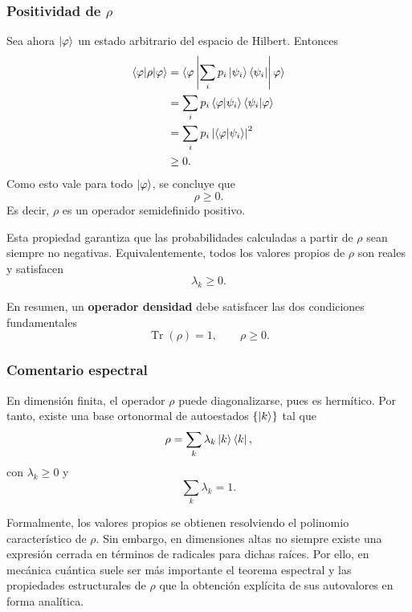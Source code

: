 \documentclass[12pt,a4paper]{article}
\theoremstyle{definition}
\theoremstyle{plain}
\theoremstyle{remark}
\begin{document}
\subsubsection*{Positividad de $\rho$}

Sea ahora $\ket{\varphi}$ un estado arbitrario del espacio de Hilbert. Entonces
\begin{align*}
    \braket{\varphi|\rho|\varphi}
    &= \braket{\varphi\left|\sum_i p_i \ket{\psi_i}\bra{\psi_i}\right|\varphi} \\
    &= \sum_i p_i \braket{\varphi|\psi_i}\braket{\psi_i|\varphi} \\
    &= \sum_i p_i \left|\braket{\varphi|\psi_i}\right|^2 \\
    &\geq 0.
\end{align*}
Como esto vale para todo $\ket{\varphi}$, se concluye que
\begin{equation*}
    \rho \geq 0.
\end{equation*}
Es decir, $\rho$ es un operador semidefinido positivo.

Esta propiedad garantiza que las probabilidades calculadas a partir de $\rho$ sean siempre no negativas. Equivalentemente, todos los valores propios de $\rho$ son reales y satisfacen
\begin{equation*}
    \lambda_k \geq 0.
\end{equation*}

En resumen, un \textbf{operador densidad} debe satisfacer las dos condiciones fundamentales
\begin{equation*}
    \operatorname{Tr}(\rho)=1,
    \qquad
    \rho\geq 0.
\end{equation*}

\subsubsection*{Comentario espectral}

En dimensión finita, el operador $\rho$ puede diagonalizarse, pues es hermítico. Por tanto, existe una base ortonormal de autoestados $\{\ket{k}\}$ tal que
\begin{equation*}
    \rho = \sum_k \lambda_k \ket{k}\bra{k},
\end{equation*}
con $\lambda_k\geq 0$ y
\begin{equation*}
    \sum_k \lambda_k = 1.
\end{equation*}

Formalmente, los valores propios se obtienen resolviendo el polinomio característico de $\rho$. Sin embargo, en dimensiones altas no siempre existe una expresión cerrada en términos de radicales para dichas raíces. Por ello, en mecánica cuántica suele ser más importante el teorema espectral y las propiedades estructurales de $\rho$ que la obtención explícita de sus autovalores en forma analítica.
\end{document}
